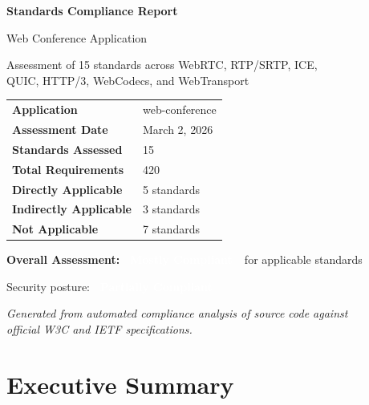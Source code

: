 \documentclass[11pt,letterpaper]{article}
\newcommand{\mostlycompliant}{\colorbox{partial}{\textcolor{white}{\textbf{\small~Mostly Compliant~}}}}
\newcommand{\partiallycompliant}{\colorbox{noncompliant}{\textcolor{white}{\textbf{\small~Partially Compliant~}}}}
\begin{document}
\begin{titlepage}
\centering
\vspace*{2cm}
{\Huge\bfseries\color{headerbg} Standards Compliance Report\par}
\vspace{0.5cm}
{\LARGE\color{headerbg!70} Web Conference Application\par}
\vspace{2cm}
{\large Assessment of 15 standards across WebRTC, RTP/SRTP, ICE,\\QUIC, HTTP/3, WebCodecs, and WebTransport\par}
\vspace{2cm}

\begin{tabular}{ll}
\toprule
\textbf{Application} & web-conference \\
\textbf{Assessment Date} & March 2, 2026 \\
\textbf{Standards Assessed} & 15 \\
\textbf{Total Requirements} & 420 \\
\textbf{Directly Applicable} & 5 standards \\
\textbf{Indirectly Applicable} & 3 standards \\
\textbf{Not Applicable} & 7 standards \\
\bottomrule
\end{tabular}

\vspace{2cm}
{\large\textbf{Overall Assessment:} \mostlycompliant\ for applicable standards\par}
\vspace{0.5cm}
{\normalsize Security posture: \partiallycompliant\par}

\vfill
{\small\textit{Generated from automated compliance analysis of source code against\\official W3C and IETF specifications.}\par}
\end{titlepage}

\tableofcontents
\newpage

\section{Executive Summary}
\end{document}
